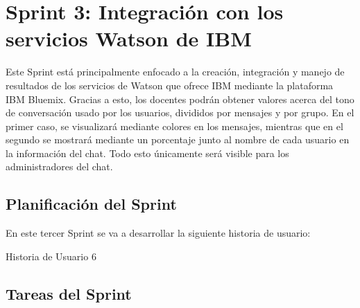 \clearpage

\section{Sprint 3: Integración con los servicios Watson de IBM}
Este Sprint está principalmente enfocado a la creación, integración y manejo de resultados de los servicios de Watson que ofrece IBM mediante la plataforma IBM Bluemix. Gracias a esto, los docentes podrán obtener valores acerca del tono de conversación usado por los usuarios, divididos por mensajes y por grupo. En el primer caso, se visualizará mediante colores en los mensajes, mientras que en el segundo se mostrará mediante un porcentaje junto al nombre de cada usuario en la información del chat. Todo esto únicamente será visible para los administradores del chat.

\subsection{Planificación del Sprint}
En este tercer Sprint se va a desarrollar la siguiente historia de usuario:

\begin{table}[hp]
	\centering
	{\small
		
	}
	\caption[Historia de Usuario 6]
	{Historia de Usuario 6}
	\label{tab:historia6}
\end{table}

\subsection{Tareas del Sprint}
